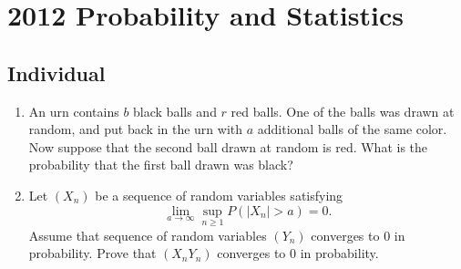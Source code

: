 \section{2012 Probability and Statistics}

\subsection{Individual}

\begin{exercise}\label{probability:2012:1}
\begin{enumerate}
    \item An urn contains $b$ black balls and $r$ red balls. One of the balls was drawn at random, and put back in the urn with $a$ additional balls of the same color. Now suppose that the second ball drawn at random is red. What is the probability that the first ball drawn was black?
    \item Let $(X_n)$ be a sequence of random variables satisfying
    \[ \lim_{a \to \infty} \sup_{n \geq 1} P(|X_n| > a) = 0. \]
    Assume that sequence of random variables $(Y_n)$ converges to 0 in probability. Prove that $(X_n Y_n)$ converges to 0 in probability.
\end{enumerate}
\end{exercise}

